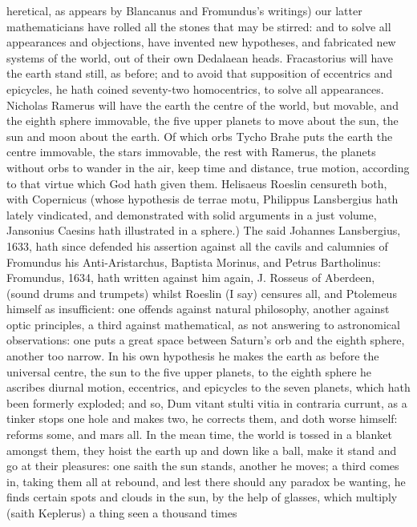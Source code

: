 {heretical, as appears by Blancanus and Fromundus's writings) our latter
mathematicians have rolled all the stones that may be stirred: and to
solve all appearances and objections, have invented new hypotheses, and
fabricated new systems of the world, out of their own Dedalaean heads.
Fracastorius will have the earth stand still, as before; and to avoid
that supposition of eccentrics and epicycles, he hath coined
seventy-two homocentrics, to solve all appearances. Nicholas Ramerus
will have the earth the centre of the world, but movable, and the
eighth sphere immovable, the five upper planets to move about the sun,
the sun and moon about the earth. Of which orbs Tycho Brahe puts the
earth the centre immovable, the stars immovable, the rest with Ramerus,
the planets without orbs to wander in the air, keep time and distance,
true motion, according to that virtue which God hath given them.
Helisaeus Roeslin censureth both, with Copernicus (whose
hypothesis de terrae motu, Philippus Lansbergius hath lately
vindicated, and demonstrated with solid arguments in a just volume,
Jansonius Caesins hath illustrated in a sphere.) The said
Johannes Lansbergius, 1633, hath since defended his assertion against
all the cavils and calumnies of Fromundus his Anti-Aristarchus,
Baptista Morinus, and Petrus Bartholinus: Fromundus, 1634, hath written
against him again, J. Rosseus of Aberdeen, \etc{} (sound drums and
trumpets) whilst Roeslin (I say) censures all, and Ptolemeus himself as
insufficient: one offends against natural philosophy, another against
optic principles, a third against mathematical, as not answering to
astronomical observations: one puts a great space between Saturn's orb
and the eighth sphere, another too narrow. In his own hypothesis he
makes the earth as before the universal centre, the sun to the five
upper planets, to the eighth sphere he ascribes diurnal motion,
eccentrics, and epicycles to the seven planets, which hath been
formerly exploded; and so, Dum vitant stulti vitia in contraria
currunt, as a tinker stops one hole and makes two, he corrects
them, and doth worse himself: reforms some, and mars all. In the mean
time, the world is tossed in a blanket amongst them, they hoist the
earth up and down like a ball, make it stand and go at their pleasures:
one saith the sun stands, another he moves; a third comes in, taking
them all at rebound, and lest there should any paradox be wanting, he
finds certain spots and clouds in the sun, by the help of
glasses, which multiply (saith Keplerus) a thing seen a thousand times
}

